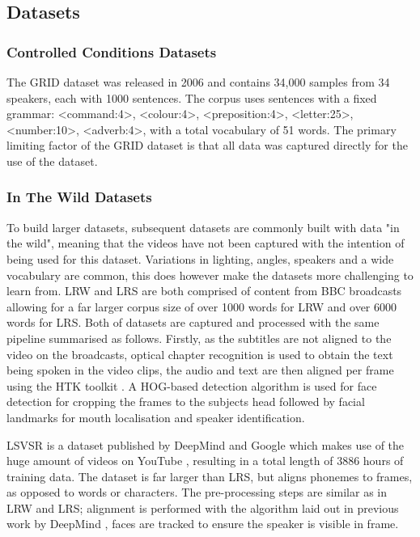 \documentclass[12pt]{article}
\begin{document}
\subsection{Datasets}

\subsubsection{Controlled Conditions Datasets}
The GRID dataset was released in 2006 \cite{Cooke2006} and contains 34,000 samples from 34 speakers, each with 1000 sentences.
The corpus uses sentences with a fixed grammar: 
<command:4>, <colour:4>, <preposition:4>, <letter:25>, <number:10>, <adverb:4>, with a total vocabulary of 51 words.
The primary limiting factor of the GRID dataset is that all data was captured directly for the use of the dataset.

\subsubsection{In The Wild Datasets}
To build larger datasets, subsequent datasets are commonly built with data "in the wild", meaning that the videos have not been captured with the intention of being used for this dataset.
Variations in lighting, angles, speakers and a wide vocabulary are common, this does however make the datasets more challenging to learn from.
LRW and LRS are both comprised of content from BBC broadcasts \cite{Chung2016, Chung2017} allowing for a far larger corpus size of over 1000 words for LRW and over 6000 words for LRS.
Both of datasets are captured and processed with the same pipeline summarised as follows. 
Firstly, as the subtitles are not aligned to the video on the broadcasts, optical chapter recognition is used to obtain the text being spoken in the video clips, the audio and text are then aligned per frame using the HTK toolkit \cite{Woodland1995}. 
A HOG-based detection algorithm \cite{King2009} is used for face detection for cropping the frames to the subjects head followed by facial landmarks for mouth localisation and speaker identification. 

LSVSR is a dataset published by DeepMind and Google which makes use of the huge amount of videos on YouTube \cite{Shillingford2018}, resulting in a total length of 3886 hours of training data.
The dataset is far larger than LRS, but aligns phonemes to frames, as opposed to words or characters.
The pre-processing steps are similar as in LRW and LRS; alignment is performed with the algorithm laid out in previous work by DeepMind \cite{Liao2013}, faces are tracked to ensure the speaker is visible in frame.
\end{document}
